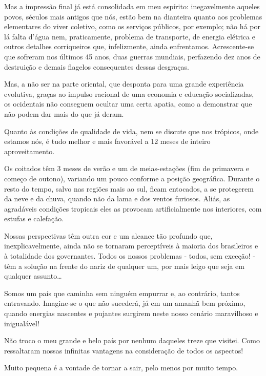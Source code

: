 Mas a impressão final já está consolidada em meu espírito: inegavelmente aqueles povos, séculos mais antigos que nós, estão bem na dianteira quanto aos problemas elementares do viver coletivo, como os serviços públicos, por exemplo; não há por lá falta d’água nem, praticamente, problema de transporte, de energia elétrica e outros detalhes corriqueiros que, infelizmente, ainda enfrentamos. Acrescente-se que sofreram nos últimos 45 anos, duas guerras mundiais, perfazendo dez anos de destruição e demais flagelos consequentes dessas desgraças.

Mas, a não ser na parte oriental, que desponta para uma grande experiência evolutiva, graças ao impulso racional de uma economia e educação socializadas, os ocidentais não conseguem ocultar uma certa apatia, como a demonstrar que não podem dar mais do que já deram.

Quanto às condições de qualidade de vida, nem se discute que nos trópicos, onde estamos nós, é tudo melhor e mais favorável a 12 meses de inteiro aproveitamento.

Os coitados têm 3 meses de verão e um de meias-estações (fim de primavera e começo de outono), variando um pouco conforme a posição geográfica. Durante o resto do tempo, salvo nas regiões mais ao sul, ficam entocados, a se protegerem da neve e da chuva, quando não da lama e dos ventos furiosos. Aliás, as agradáveis condições tropicais eles as provocam artificialmente nos interiores, com estufas e calefação.

Nossas perspectivas têm outra cor e um alcance tão profundo que, inexplicavelmente, ainda não se tornaram perceptíveis à maioria dos brasileiros e à totalidade dos governantes. Todos os nossos problemas - todos, sem exceção! - têm a solução na frente do nariz de qualquer um, por mais leigo que seja em qualquer assunto\ldots

Somos um país que caminha sem ninguém empurrar e, ao contrário, tantos entravando. Imagine-se o que não sucederá, já em um amanhã bem próximo, quando energias nascentes e pujantes surgirem neste nosso cenário maravilhoso e inigualável!

Não troco o meu grande e belo país por nenhum daqueles treze que visitei. Como ressaltaram nossas infinitas vantagens na consideração de todos os aspectos!

Muito pequena é a vontade de tornar a sair, pelo menos por muito tempo.